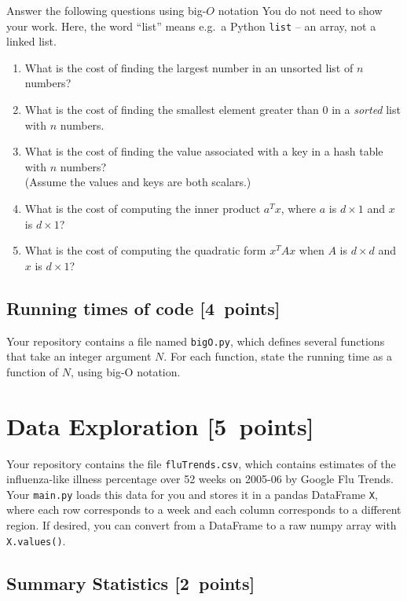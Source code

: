 \documentclass{article}
\newcommand{\blu}[1]{{\textcolor{blu}{#1}}}
\let\ask\blu
\newcommand\pts[1]{\textcolor{pointscolour}{[#1~points]}}
\begin{document}
  \ask{Answer the following questions using big-$O$ notation} You do not need to show your work.
  Here, the word ``list'' means e.g.\ a Python \texttt{list} -- an array, not a linked list.
  \begin{enumerate}
  \item What is the cost of finding the largest number in an unsorted list of $n$ numbers?
  \item What is the cost of finding the smallest element greater than 0 in a \emph{sorted} list with $n$ numbers.
  \item What is the cost of finding the value associated with a key in a hash table with $n$ numbers? \\(Assume the values and keys are both scalars.)
  \item What is the cost of computing the inner product $a^Tx$, where $a$ is $d \times 1$ and $x$ is $d \times 1$?
  \item What is the cost of computing the quadratic form $x^TAx$ when $A$ is $d \times d$ and $x$ is $d \times 1$?
  \end{enumerate}

  \subsection{Running times of code \pts{4}}

  Your repository contains a file named \texttt{bigO.py}, which defines several functions
  that take an integer argument $N$. For each function, \ask{state the running time as a function of $N$, using big-O notation}.


  \clearpage\section{Data Exploration \pts{5}}


  Your repository contains the file \texttt{fluTrends.csv}, which contains estimates
  of the influenza-like illness percentage over 52 weeks on 2005-06 by Google Flu Trends.
  Your \texttt{main.py} loads this data for you and stores it in a pandas DataFrame \texttt{X},
  where each row corresponds to a week and each column
  corresponds to a different
  region. If desired, you can convert from a DataFrame to a raw numpy array with \texttt{X.values()}.

  \subsection{Summary Statistics \pts{2}}
\end{document}
